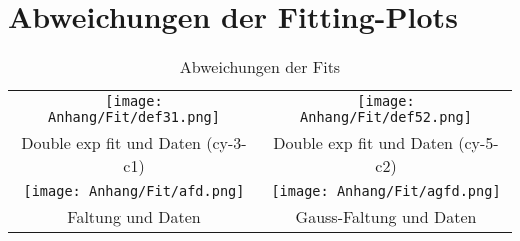 \chapter{Abweichungen der Fitting-Plots}
\begin{table}[h]
    \centering\begin{tabular}{cc}
      \texttt{[image: Anhang/Fit/def31.png]} & \texttt{[image: Anhang/Fit/def52.png]}\\
      Double exp fit und Daten (cy-3-c1) & Double exp fit und Daten (cy-5-c2)\\
      \texttt{[image: Anhang/Fit/afd.png]} & \texttt{[image: Anhang/Fit/agfd.png]}\\
      Faltung und Daten & Gauss-Faltung und Daten
    \end{tabular}
    \caption{Abweichungen der Fits}
  \end{table}